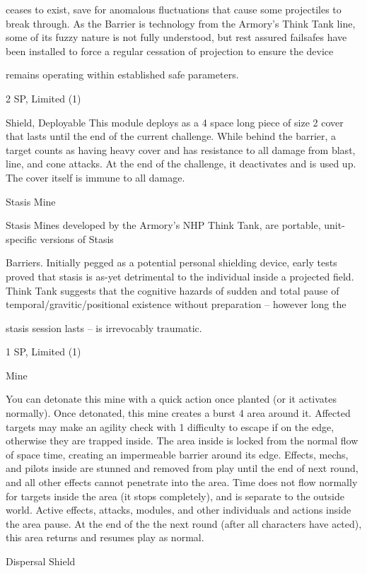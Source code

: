 ceases to exist, save for anomalous fluctuations that cause some projectiles to break through. As the
Barrier is technology from the Armory's Think Tank line, some of its fuzzy nature is not fully understood, but
rest assured failsafes have been installed to force a regular cessation of projection to ensure the device

remains operating within established safe parameters.

2 SP, Limited (1)

Shield, Deployable
This module deploys as a 4 space long piece of size 2 cover that lasts until the end of the current
challenge. While behind the barrier, a target counts as having heavy cover and has resistance to
all damage from blast, line, and cone attacks. At the end of the challenge, it deactivates and is
used up. The cover itself is immune to all damage.


Stasis Mine

Stasis Mines developed by the Armory's NHP Think Tank, are portable, unit-specific versions of Stasis

Barriers. Initially pegged as a potential personal shielding device, early tests proved that stasis is as-yet
detrimental to the individual inside a projected field. Think Tank suggests that the cognitive hazards of
sudden and total pause of temporal/gravitic/positional existence without preparation -- however long the

stasis session lasts -- is irrevocably traumatic.

1 SP,  Limited (1)


Mine

You can detonate this mine with a quick action once planted (or it activates normally). Once
detonated, this mine creates a burst 4 area around it. Affected targets may make an agility check
with 1 difficulty to escape if on the edge, otherwise they are trapped inside. The area inside is
locked from the normal flow of space time, creating an impermeable barrier around its edge.
Effects, mechs, and pilots inside are stunned and removed from play until the end of next round,
and all other effects cannot penetrate into the area. Time does not flow normally for targets
inside the area (it stops completely), and is separate to the outside world. Active effects, attacks,
modules, and other individuals and actions inside the area pause. At the end of the the next
round (after all characters have acted), this area returns and resumes play as normal.


Dispersal Shield

